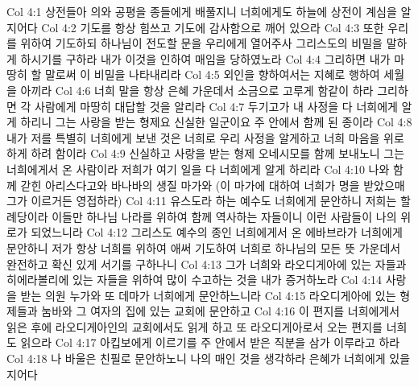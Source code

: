 Col 4:1  상전들아 의와 공평을 종들에게 배풀지니 너희에게도 하늘에 상전이 계심을 알지어다
Col 4:2  기도를 항상 힘쓰고 기도에 감사함으로 깨어 있으라
Col 4:3  또한 우리를 위하여 기도하되 하나님이 전도할 문을 우리에게 열어주사 그리스도의 비밀을 말하게 하시기를 구하라 내가 이것을 인하여 매임을 당하였노라
Col 4:4  그리하면 내가 마땅히 할 말로써 이 비밀을 나타내리라
Col 4:5  외인을 향하여서는 지혜로 행하여 세월을 아끼라
Col 4:6  너희 말을 항상 은혜 가운데서 소금으로 고루게 함같이 하라 그리하면 각 사람에게 마땅히 대답할 것을 알리라
Col 4:7  두기고가 내 사정을 다 너희에게 알게 하리니 그는 사랑을 받는 형제요 신실한 일군이요 주 안에서 함께 된 종이라
Col 4:8  내가 저를 특별히 너희에게 보낸 것은 너희로 우리 사정을 알게하고 너희 마음을 위로하게 하려 함이라
Col 4:9  신실하고 사랑을 받는 형제 오네시모를 함께 보내노니 그는 너희에게서 온 사람이라 저희가 여기 일을 다 너희에게 알게 하리라
Col 4:10  나와 함께 갇힌 아리스다고와 바나바의 생질 마가와 (이 마가에 대하여 너희가 명을 받았으매 그가 이르거든 영접하라)
Col 4:11  유스도라 하는 예수도 너희에게 문안하니 저희는 할례당이라 이들만 하나님 나라를 위하여 함께 역사하는 자들이니 이런 사람들이 나의 위로가 되었느니라
Col 4:12  그리스도 예수의 종인 너희에게서 온 에바브라가 너희에게 문안하니 저가 항상 너희를 위하여 애써 기도하여 너희로 하나님의 모든 뜻 가운데서 완전하고 확신 있게 서기를 구하나니
Col 4:13  그가 너희와 라오디게아에 있는 자들과 히에라볼리에 있는 자들을 위하여 많이 수고하는 것을 내가 증거하노라
Col 4:14  사랑을 받는 의원 누가와 또 데마가 너희에게 문안하느니라
Col 4:15  라오디게아에 있는 형제들과 눔바와 그 여자의 집에 있는 교회에 문안하고
Col 4:16  이 편지를 너희에게서 읽은 후에 라오디게아인의 교회에서도 읽게 하고 또 라오디게아로서 오는 편지를 너희도 읽으라
Col 4:17  아킵보에게 이르기를 주 안에서 받은 직분을 삼가 이루라고 하라
Col 4:18  나 바울은 친필로 문안하노니 나의 매인 것을 생각하라 은혜가 너희에게 있을지어다



